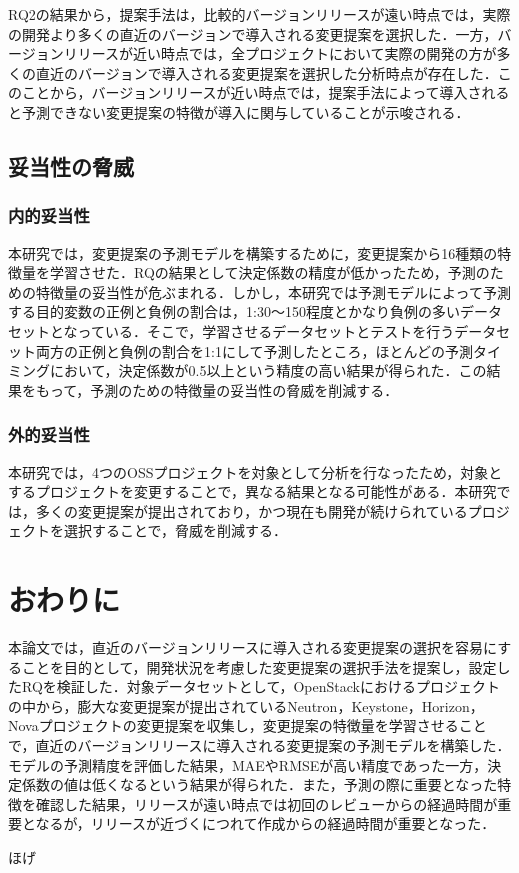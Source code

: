 \documentclass[submit,ses,noauthor]{ipsj}
\begin{document}
RQ2の結果から，提案手法は，比較的バージョンリリースが遠い時点では，実際の開発より多くの直近のバージョンで導入される変更提案を選択した．一方，バージョンリリースが近い時点では，全プロジェクトにおいて実際の開発の方が多くの直近のバージョンで導入される変更提案を選択した分析時点が存在した．このことから，バージョンリリースが近い時点では，提案手法によって導入されると予測できない変更提案の特徴が導入に関与していることが示唆される．

\subsection{妥当性の脅威}

\subsubsection{内的妥当性}
本研究では，変更提案の予測モデルを構築するために，変更提案から16種類の特徴量を学習させた．RQの結果として決定係数の精度が低かったため，予測のための特徴量の妥当性が危ぶまれる．しかし，本研究では予測モデルによって予測する目的変数の正例と負例の割合は，1:30〜150程度とかなり負例の多いデータセットとなっている．そこで，学習させるデータセットとテストを行うデータセット両方の正例と負例の割合を1:1にして予測したところ，ほとんどの予測タイミングにおいて，決定係数が0.5以上という精度の高い結果が得られた．この結果をもって，予測のための特徴量の妥当性の脅威を削減する．

\subsubsection{外的妥当性}
本研究では，4つのOSSプロジェクトを対象として分析を行なったため，対象とするプロジェクトを変更することで，異なる結果となる可能性がある．本研究では，多くの変更提案が提出されており，かつ現在も開発が続けられているプロジェクトを選択することで，脅威を削減する．

\section{おわりに}\label{chap:fig-tab-exp}

本論文では，直近のバージョンリリースに導入される変更提案の選択を容易にすることを目的として，開発状況を考慮した変更提案の選択手法を提案し，設定したRQを検証した．対象データセットとして，OpenStackにおけるプロジェクトの中から，膨大な変更提案が提出されているNeutron，Keystone，Horizon，Novaプロジェクトの変更提案を収集し，変更提案の特徴量を学習させることで，直近のバージョンリリースに導入される変更提案の予測モデルを構築した．モデルの予測精度を評価した結果，MAEやRMSEが高い精度であった一方，決定係数の値は低くなるという結果が得られた．また，予測の際に重要となった特徴を確認した結果，リリースが遠い時点では初回のレビューからの経過時間が重要となるが，リリースが近づくにつれて作成からの経過時間が重要となった．


\begin{acknowledgment}
ほげ
\end{acknowledgment}



\end{document}
